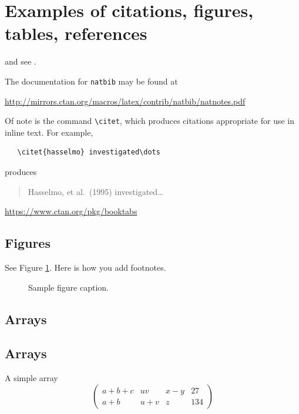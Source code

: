 \documentclass[twocolumn, switch]{article} %
\begin{document}
\section{Examples of citations, figures, tables, references}
\label{sec:others}
\lipsum[8] \cite{kour2014real,kour2014fast} and see \cite{hadash2018estimate}.

The documentation for \verb+natbib+ may be found at
\begin{center}
  \url{http://mirrors.ctan.org/macros/latex/contrib/natbib/natnotes.pdf}
\end{center}
Of note is the command \verb+\citet+, which produces citations
appropriate for use in inline text.  For example,
\begin{verbatim}
   \citet{hasselmo} investigated\dots
\end{verbatim}
produces
\begin{quote}
  Hasselmo, et al.\ (1995) investigated\dots
\end{quote}

\begin{center}
  \url{https://www.ctan.org/pkg/booktabs}
\end{center}


\subsection{Figures}
\lipsum[10]
See Figure \ref{fig:fig1}. Here is how you add footnotes. %
\lipsum[11]

\begin{figure}[H]
  \centering
  \fbox{\rule[-.5cm]{4cm}{4cm} \rule[-.5cm]{4cm}{0cm}}
  \caption{Sample figure caption.}
  \label{fig:fig1}
\end{figure}

\subsection{Arrays}
\lipsum[11]
\subsection{Arrays}

A simple array
\begin{equation}
\left(
\begin{array}{cccc}
a+b+c & uv & x-y & 27\\
a+b & u+v & z & 134
\end{array}\right)
\end{equation}
\end{document}
